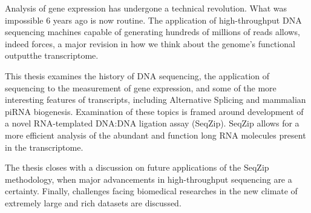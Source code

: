 \label{hd:abstract}
\abstract{}

Analysis of gene expression has undergone a technical revolution. What was impossible 6 years ago is now routine. The application of high-throughput DNA sequencing machines capable of generating hundreds of millions of reads allows, indeed forces, a major revision in how we think about the genome's functional output\textendash the transcriptome.

\indent This thesis examines the history of DNA sequencing, the application of sequencing to the measurement of gene expression, and some of the more interesting features of transcripts, including Alternative Splicing and mammalian piRNA biogenesis. Examination of these topics is framed around development of a novel RNA-templated DNA:DNA ligation assay (SeqZip). SeqZip allows for a more efficient analysis of the abundant and function long RNA molecules present in the transcriptome.

\indent The thesis closes with a discussion on future applications of the SeqZip methodology, when major advancements in high-throughput sequencing are a certainty. Finally, challenges facing biomedical researches in the new climate of extremely large and rich datasets are discussed.

\setcounter{page}{3}
\clearpage %